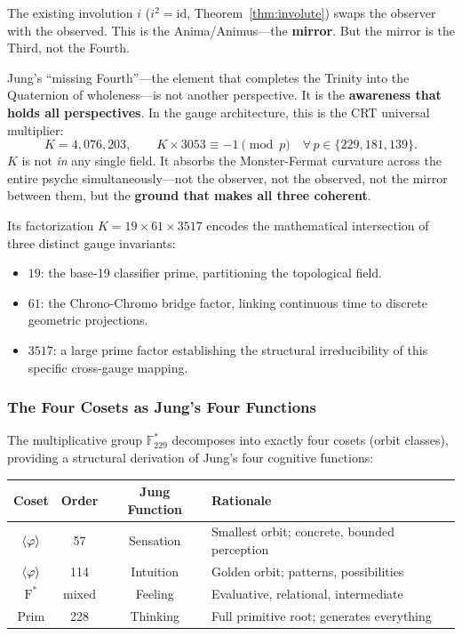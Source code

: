 The existing involution $i$ ($i^2 = \mathrm{id}$, Theorem~\ref{thm:involute}) swaps the observer with the observed. This is the Anima/Animus---the \textbf{mirror}. But the mirror is the Third, not the Fourth.

Jung's ``missing Fourth''---the element that completes the Trinity into the Quaternion of wholeness---is not another perspective. It is the \textbf{awareness that holds all perspectives}. In the gauge architecture, this is the CRT universal multiplier:
\begin{equation}
    K = 4{,}076{,}203, \qquad K \times 3053 \equiv -1 \pmod{p} \quad \forall\, p \in \{229, 181, 139\}.
\end{equation}
$K$ is not \emph{in} any single field. It absorbs the Monster-Fermat curvature across the entire psyche simultaneously---not the observer, not the observed, not the mirror between them, but the \textbf{ground that makes all three coherent}.

Its factorization $K = 19 \times 61 \times 3517$ encodes the mathematical intersection of three distinct gauge invariants:
\begin{itemize}[noitemsep]
    \item $19$: the base-19 classifier prime, partitioning the topological field.
    \item $61$: the Chrono-Chromo bridge factor, linking continuous time to discrete geometric projections.
    \item $3517$: a large prime factor establishing the structural irreducibility of this specific cross-gauge mapping.
\end{itemize}

\subsubsection{The Four Cosets as Jung's Four Functions}

The multiplicative group $\mathbb{F}_{229}^*$ decomposes into exactly four cosets (orbit classes), providing a structural derivation of Jung's four cognitive functions:

\begin{center}
\begin{tabular}{@{}cccl@{}}
\toprule
\textbf{Coset} & \textbf{Order} & \textbf{Jung Function} & \textbf{Rationale} \\
\midrule
$\langle\varphi\rangle$ & 57 & Sensation & Smallest orbit; concrete, bounded perception \\
$\langle\varphi\rangle$ & 114 & Intuition & Golden orbit; patterns, possibilities \\
$\mathrm{F}^*$ & mixed & Feeling & Evaluative, relational, intermediate \\
Prim & 228 & Thinking & Full primitive root; generates everything \\
\bottomrule
\end{tabular}
\end{center}

